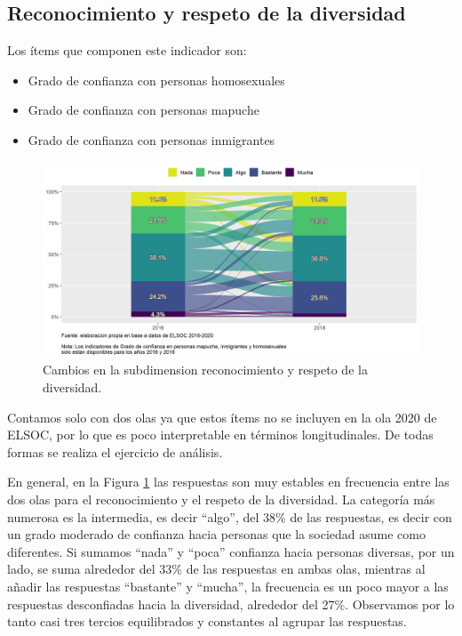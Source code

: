 \documentclass[
  12pt,
]{book}
\begin{document}
\hypertarget{reconocimiento-y-respeto-de-la-diversidad}{%
\subsection{Reconocimiento y respeto de la diversidad}\label{reconocimiento-y-respeto-de-la-diversidad}}

Los ítems que componen este indicador son:

\begin{itemize}
\item
  Grado de confianza con personas homosexuales
\item
  Grado de confianza con personas mapuche
\item
  Grado de confianza con personas inmigrantes
\end{itemize}

\begin{figure}[H]

{\centering \includegraphics[width=1\linewidth,height=1\textheight]{output/graphs/alluvial_diversidad} 

}

\caption{Cambios en la subdimension reconocimiento y respeto de la diversidad.}\label{fig:alluvial-diversidad}
\end{figure}

Contamos solo con dos olas ya que estos ítems no se incluyen en la ola 2020 de ELSOC, por lo que es poco interpretable en términos longitudinales. De todas formas se realiza el ejercicio de análisis.

En general, en la Figura \ref{fig:alluvial-diversidad} las respuestas son muy estables en frecuencia entre las dos olas para el reconocimiento y el respeto de la diversidad. La categoría más numerosa es la intermedia, es decir ``algo'', del 38\% de las respuestas, es decir con un grado moderado de confianza hacia personas que la sociedad asume como diferentes. Si sumamos ``nada'' y ``poca'' confianza hacia personas diversas, por un lado, se suma alrededor del 33\% de las respuestas en ambas olas, mientras al añadir las respuestas ``bastante'' y ``mucha'', la frecuencia es un poco mayor a las respuestas desconfiadas hacia la diversidad, alrededor del 27\%. Observamos por lo tanto casi tres tercios equilibrados y constantes al agrupar las respuestas.
\end{document}
